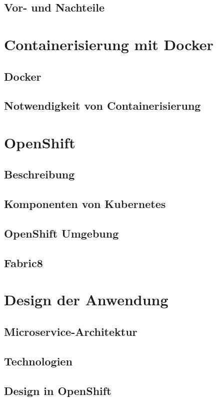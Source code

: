 \documentclass[master,german]{hgbthesis}
\begin{document}
\section{Vor- und Nachteile}


\chapter{Containerisierung mit Docker}
\section{Docker}
\section{Notwendigkeit von Containerisierung}


\chapter{OpenShift}
\section{Beschreibung}
\section{Komponenten von Kubernetes}
\section{OpenShift Umgebung}
\section{Fabric8}

\chapter{Design der Anwendung}
\section{Microservice-Architektur}
\section{Technologien}
\section{Design in OpenShift}
\end{document}
